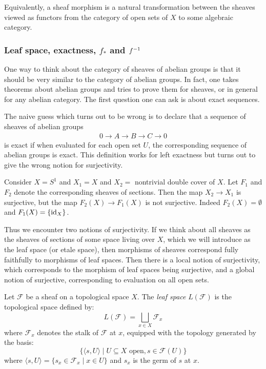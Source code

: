 \documentclass[12pt]{article}
\begin{document}
Equivalently, a sheaf morphism is a natural transformation between the sheaves viewed as functors from the category of open sets of $X$ to some algebraic category.

\subsubsection{Leaf space, exactness, $f_*$ and ${f}^{-1}$}
One way to think about the category of sheaves of abelian groups is that it should be very similar to the category of abelian groups. In fact, one takes theorems about abelian groups and tries to prove them for sheaves, or in general for any abelian category. The first question one can ask is about exact sequences.

The naive guess which turns out to be wrong is to declare that a sequence of sheaves of abelian groups \begin{align*}
    0 \to A \to B \to C \to 0
\end{align*} is exact if when evaluated for each open set $U$, the corresponding sequence of abelian groups is exact. This definition works for left exactness but turns out to give the wrong notion for surjectivity.

\begin{example}
    Consider $X = S^1$ and $X_1 = X$ and $X_2 = $ nontrivial double cover of $X$. Let $F_1$ and $F_2$ denote the corresponding sheaves of sections. Then the map $X_2 \to X_1$ is surjective, but the map $F_2(X) \to F_1(X)$ is not surjective. Indeed $F_2(X) = \emptyset$ and $F_1(X) = \{\operatorname{id}_X\}$. 

    Thus we encounter two notions of surjectivity. If we think about all sheaves as the sheaves of sections of some space living over $X$, which we will introduce as the leaf space (or etale space), then morphisms of sheaves correspond fully faithfully to morphisms of leaf spaces. Then there is a local notion of surjectivity, which corresponds to the morphism of leaf spaces being surjective, and a global notion of surjective, corresponding to evaluation on all open sets.
\end{example}

\begin{definition}
    Let $\mathcal{F}$ be a sheaf on a topological space $X$. The \emph{leaf space} $L(\mathcal{F})$ is the topological space defined by:
    \[
    L(\mathcal{F}) = \bigsqcup_{x \in X} \mathcal{F}_x
    \]
    where $\mathcal{F}_x$ denotes the stalk of $\mathcal{F}$ at $x$, equipped with the topology generated by the basis:
    \[
    \{ \langle s, U \rangle \mid U \subseteq X \text{ open}, s \in \mathcal{F}(U) \}
    \]
    where $\langle s, U \rangle = \{ s_x \in \mathcal{F}_x \mid x \in U \}$ and $s_x$ is the germ of $s$ at $x$.
    \end{definition}
    
\end{document}
